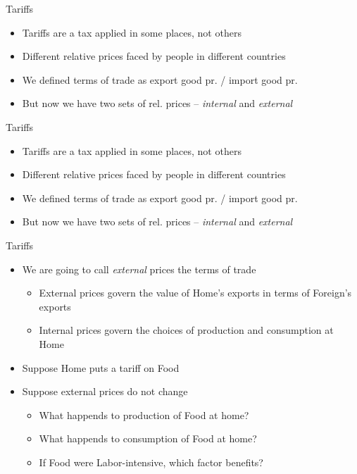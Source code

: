 \documentclass[ignorenonframetext,]{beamer}
\begin{document}
\begin{frame}{Tariffs}
    
    \begin{itemize}
        \item Tariffs are a tax applied in some places, not others
        \item Different relative prices faced by people in different countries
        \item We defined terms of trade as export good pr. / import good pr.
        \item But now we have two sets of rel. prices -- \emph{internal} and \emph{external}
    \end{itemize}

\end{frame}

\begin{frame}{Tariffs}
    
    \begin{itemize}
        \item Tariffs are a tax applied in some places, not others
        \item Different relative prices faced by people in different countries
        \item We defined terms of trade as export good pr. / import good pr.
        \item But now we have two sets of rel. prices -- \emph{internal} and \emph{external}
    \end{itemize}

\end{frame}

\begin{frame}{Tariffs}
    
    \begin{itemize}
        \item We are going to call \emph{external} prices the terms of trade
        \begin{itemize}
            \item External prices govern the value of Home's exports in terms of Foreign's exports
            \item Internal prices govern the choices of production and consumption at Home
        \end{itemize}
        \item Suppose Home puts a tariff on Food
        \item Suppose external prices do not change
        \begin{itemize}
            \item What happends to production of Food at home?
            \item What happends to consumption of Food at home?
            \item If Food were Labor-intensive, which factor benefits?
        \end{itemize}
    \end{itemize}

\end{frame}
\end{document}
